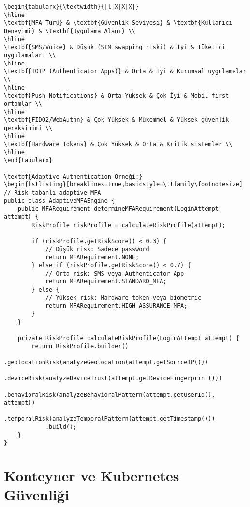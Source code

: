 \begin{lstlisting}[breaklines=true,basicstyle=\ttfamily\footnotesize]
\begin{tabularx}{\textwidth}{|l|X|X|X|}
\hline
\textbf{MFA Türü} & \textbf{Güvenlik Seviyesi} & \textbf{Kullanıcı Deneyimi} & \textbf{Uygulama Alanı} \\
\hline
\textbf{SMS/Voice} & Düşük (SIM swapping riski) & İyi & Tüketici uygulamaları \\
\hline
\textbf{TOTP (Authenticator Apps)} & Orta & İyi & Kurumsal uygulamalar \\
\hline
\textbf{Push Notifications} & Orta-Yüksek & Çok İyi & Mobil-first ortamlar \\
\hline
\textbf{FIDO2/WebAuthn} & Çok Yüksek & Mükemmel & Yüksek güvenlik gereksinimi \\
\hline
\textbf{Hardware Tokens} & Çok Yüksek & Orta & Kritik sistemler \\
\hline
\end{tabularx}

\textbf{Adaptive Authentication Örneği:}
\begin{lstlisting}[breaklines=true,basicstyle=\ttfamily\footnotesize]
// Risk tabanlı adaptive MFA
public class AdaptiveMFAEngine {
    public MFARequirement determineMFARequirement(LoginAttempt attempt) {
        RiskProfile riskProfile = calculateRiskProfile(attempt);
        
        if (riskProfile.getRiskScore() < 0.3) {
            // Düşük risk: Sadece password
            return MFARequirement.NONE;
        } else if (riskProfile.getRiskScore() < 0.7) {
            // Orta risk: SMS veya Authenticator App
            return MFARequirement.STANDARD_MFA;
        } else {
            // Yüksek risk: Hardware token veya biometric
            return MFARequirement.HIGH_ASSURANCE_MFA;
        }
    }
    
    private RiskProfile calculateRiskProfile(LoginAttempt attempt) {
        return RiskProfile.builder()
            .geolocationRisk(analyzeGeolocation(attempt.getSourceIP()))
            .deviceRisk(analyzeDeviceTrust(attempt.getDeviceFingerprint()))
            .behavioralRisk(analyzeBehavioralPattern(attempt.getUserId(), attempt))
            .temporalRisk(analyzeTemporalPattern(attempt.getTimestamp()))
            .build();
    }
}
\end{lstlisting}

\section{Konteyner ve Kubernetes Güvenliği}

